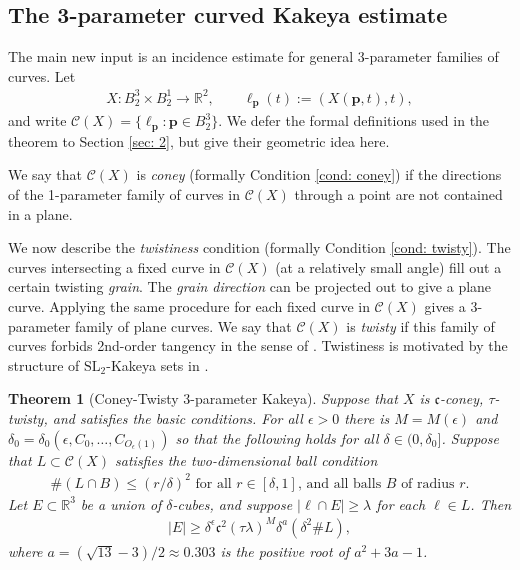 \documentclass[12pt]{amsart}
\numberwithin{equation}{section}
\newtheorem{theorem}{Theorem}
\newcommand{\R}{\mathbb{R}}
\newcommand{\1}{\mathbbm{1}}
\newcommand{\p}{\mathbf p}
\begin{document}
\subsection{The 3-parameter curved Kakeya estimate}

The main new input is an incidence estimate for general 3-parameter families of curves. Let 
\begin{align}
    X : B_2^3 \times B_2^1 \to \R^2, \qquad\ell_\p(t) := (X(\p,t),t),
\end{align}
and write $\mathcal C(X) = \{\ell_\p : \p \in B_2^3\}$. We defer the formal definitions used in the theorem to Section \ref{sec: 2}, but give their geometric idea here. 

We say that $\mathcal C(X)$ is \emph{coney} (formally Condition \ref{cond: coney}) if the directions of the 1-parameter family of curves in $\mathcal C(X)$ through a point are not contained in a plane.

We now describe the \emph{twistiness} condition (formally Condition \ref{cond: twisty}). 
The curves intersecting a fixed curve in $\mathcal C(X)$ (at a relatively small angle) fill out a certain twisting \emph{grain}. The \emph{grain direction} can be projected out to give a plane curve. Applying the same procedure for each fixed curve in $\mathcal C(X)$ gives a $3$-parameter family of plane curves. We say that $\mathcal C(X)$ is \emph{twisty} if this family of curves forbids 2nd-order tangency in the sense of \cite{zahlPlanar}.
Twistiness is motivated by the structure of $\mathrm{SL_2}$-Kakeya sets in \cite{KWZ}. 

\begin{theorem}[Coney-Twisty 3-parameter Kakeya]\label{thm: CT 3 param kak}
    Suppose that $X$ is $\mathfrak c$-coney, $\tau$-twisty, and satisfies the basic conditions. For all $\epsilon > 0$ there is $M = M(\epsilon)$ and $\delta_0 = \delta_0(\epsilon, C_0,\ldots, C_{O_\epsilon(1)})$ so that the following holds for all $\delta \in (0, \delta_0]$. 
    Suppose that $L \subset \mathcal C(X)$ satisfies the two-dimensional ball condition
    \begin{align}
        \# (L \cap B) \leq (r/ \delta)^2 \text{ for all $r \in [\delta, 1]$, and all balls $B$ of radius $r$.}
    \end{align}
    Let $E \subset \R^3$ be a union of $\delta$-cubes, and suppose $|\ell \cap E| \geq \lambda$ for each $\ell \in L$. Then 
    \begin{align}
        |E| \geq  \delta^\epsilon \mathfrak c^2 (\tau \lambda)^M \delta^a (\delta^2 \#L), 
    \end{align}
    where $a = (\sqrt{13} - 3)/2 \approx 0.303$ is the positive root of $a^2 + 3a - 1$.
\end{theorem}
\end{document}
